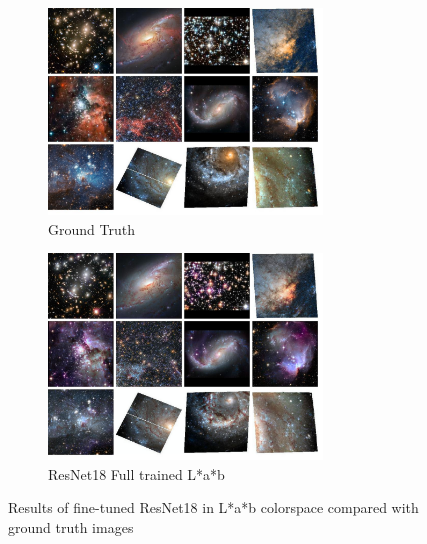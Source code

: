 \documentclass[10pt,twocolumn,letterpaper]{article}
\begin{document}
    \begin{figure}[!htb]
    	\centering
    	\begin{subfigure}[b]{0.3\textwidth}
    		\centering
    		\includegraphics[width=0.8\textwidth]{figures/samples_main}
    		\caption{Ground Truth}
    		\label{fig: main_color_samples}
    	\end{subfigure}
    		\hspace{0.1 in}
    	\begin{subfigure}[b]{0.3\textwidth}
    		\centering
    		\includegraphics[width=0.8\textwidth]{figures/samples_full-trained}
    		\caption{ResNet18 Full trained L*a*b}
    		\label{fig: resnet18_full}
    	\end{subfigure}
    	\caption{Results of fine-tuned ResNet18 in L*a*b colorspace compared with ground truth images}
    \end{figure}
\end{document}
